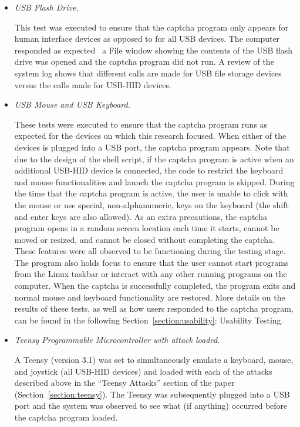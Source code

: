 \documentclass[pagenumbers]{ieee}
\begin{document}
\begin{itemize}
\item \textit{USB Flash Drive.}

This test was executed to ensure that the captcha program only appears for human interface devices as opposed to for all USB devices. The computer responded as expected \textemdash \ a File window showing the contents of the USB flash drive was opened and the captcha program did not run. A review of the system log shows that different calls are made for USB file storage devices versus the calls made for USB-HID devices.

\item \textit{USB Mouse and USB Keyboard.}

These tests were executed to ensure that the captcha program runs as expected for the devices on which this research focused. When either of the devices is plugged into a USB port, the captcha program appears. Note that due to the design of the shell script, if the captcha program is active when an additional USB-HID device is connected, the code to restrict the keyboard and mouse functionalities and launch the captcha program is skipped. During the time that the captcha program is active, the user is unable to click with the mouse or use special, non-alphanumeric, keys on the keyboard (the shift and enter keys are also allowed). As an extra precautions, the captcha program opens in a random screen location each time it starts, cannot be moved or resized, and cannot be closed without completing the captcha. These features were all observed to be functioning during the testing stage. The program also holds focus to ensure that the user cannot start programs from the Linux taskbar or interact with any other running programs on the computer. When the captcha is successfully completed, the program exits and normal mouse and keyboard functionality are restored. More details on the results of these tests, as well as how users responded to the captcha program, can be found in the following Section~\ref{section:usability}: Usability Testing.

\item \textit{Teensy Programmable Microcontroller with attack loaded.}

A Teensy (version 3.1) was set to simultaneously emulate a keyboard, mouse, and joystick (all USB-HID devices) and loaded with each of the attacks described above in the ``Teensy Attacks'' section of the paper (Section~\ref{section:teensy}). The Teensy was subsequently plugged into a USB port and the system was observed to see what (if anything) occurred before the captcha program loaded. 


\end{itemize}
\end{document}

